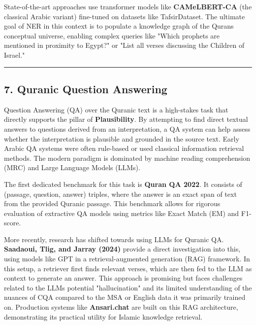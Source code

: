 \documentclass[12pt,a4paper]{article}
\begin{document}
State-of-the-art approaches use transformer models like
\textbf{CAMeLBERT-CA} (the classical Arabic variant) fine-tuned on
datasets like TafsirDataset. The ultimate goal of NER in this context is
to populate a knowledge graph of the Quran\textquotesingle s conceptual
universe, enabling complex queries like "Which prophets are mentioned in
proximity to Egypt?" or "List all verses discussing the Children of
Israel."

\begin{center}\rule{0.5\linewidth}{0.5pt}\end{center}

\protect{}\label{s7}
\subsection{7. Quranic Question
Answering}\label{quranic-question-answering}

Question Answering (QA) over the Quranic text is a high-stakes task that
directly supports the pillar of \textbf{Plausibility}. By attempting to
find direct textual answers to questions derived from an interpretation,
a QA system can help assess whether the interpretation is plausible and
grounded in the source text. Early Arabic QA systems were often
rule-based or used classical information retrieval methods. The modern
paradigm is dominated by machine reading comprehension (MRC) and Large
Language Models (LLMs).

The first dedicated benchmark for this task is
\textbf{Qur\textquotesingle an QA 2022}. It consists of (passage,
question, answer) triples, where the answer is an exact span of text
from the provided Quranic passage. This benchmark allows for rigorous
evaluation of extractive QA models using metrics like Exact Match (EM)
and F1-score.

More recently, research has shifted towards using LLMs for Quranic QA.
\textbf{Saadaoui, Tlig, and Jarray (2024)} provide a direct
investigation into this, using models like GPT in a retrieval-augmented
generation (RAG) framework. In this setup, a retriever first finds
relevant verses, which are then fed to the LLM as context to generate an
answer. This approach is promising but faces challenges related to the
LLM\textquotesingle s potential "hallucination" and its limited
understanding of the nuances of CQA compared to the MSA or English data
it was primarily trained on. Production systems like
\textbf{Ansari.chat} are built on this RAG architecture, demonstrating
its practical utility for Islamic knowledge retrieval.
\end{document}
